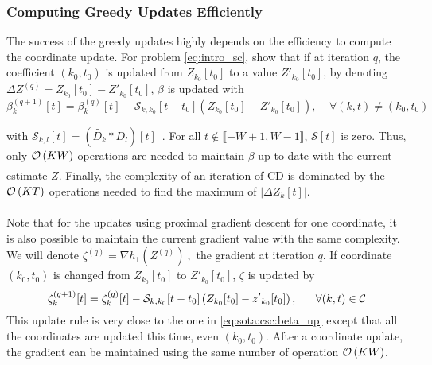 \documentclass[../thesis.tex]{subfiles}
\begin{document}


\subsubsection{Computing Greedy Updates Efficiently}
\label{ssub:cd_greedy_update}

	The success of the greedy updates highly depends on the efficiency to compute the
	coordinate update. For problem \autoref{eq:intro_sc}, \citet{Kavukcuoglu2013}
	show that if at iteration $q$, the coefficient $(k_0, t_0)$ is updated from
	$Z_{k_0}[t_0]$ to a value $Z'_{k_0}[t_0]$, by denoting $\Delta Z^{(q)} = Z_{k_0}[t_0] - Z'_{k_0}[t_0]$,
	$\beta$ is updated with
	\begin{equation}\label{eq:sota:csc:beta_up}
		\beta_k^{(q+1)}[t] = \beta_k^{(q)}[t] -
			\mathcal S_{k, k_0}[t-t_0] \left(Z_{k_0}[t_0] - Z'_{k_0}[t_0]\right),~~~~~\forall (k, t) \neq (k_0, t_0)
	\end{equation}

	with \mbox{$\mathcal S_{k, l}[t] = (\widetilde{D_k} * D_l)[t]$}~. For all
	\mbox{$t \notin\llbracket-W+1, W-1\rrbracket$}, $\mathcal S[t]$ is zero. Thus,
	only $\underset{}{\mathcal O}\left(KW\right)$ operations are needed to maintain $\beta$ up to
	date with the current estimate $Z$. Finally, the complexity of an iteration of
	CD is dominated by the $\underset{}{\mathcal O}\left(KT\right)$ operations needed to find the maximum of
	$|\Delta Z_k[t]|$.

	Note that for the updates using proximal gradient descent for one coordinate, it is
	also possible to maintain the current gradient value with the same complexity. We will
	denote $\zeta^{(q)} = \nabla h_1(Z^{(q)})~,$ the gradient at iteration $q$. If coordinate
	$(k_0, t_0)$ is changed	from $Z_{k_0}[t_0]$ to $Z'_{k_0}[t_0]$, $\zeta$ is updated	by
	\begin{equation}\label{eq:zeta_up}
		\zeta^{(q + 1)}_k[t] = \zeta^{(q)}_k[t] -
			\mathcal S_{k, k_0}[t-t_0] \left(Z_{k_0}[t_0] - {z'}_{k_0}[t_0]\right),~~~~~\forall (k, t) \in \mathcal C
	\end{equation}
	This update rule is very close to the one in \autoref{eq:sota:csc:beta_up} except that all
	the coordinates are updated this time, even $(k_0, t_0)$. After a coordinate update,
	the gradient can be maintained using the same number of operation $\underset{}{\mathcal O}\left(KW\right)$.







\biblio{}
\end{document}

